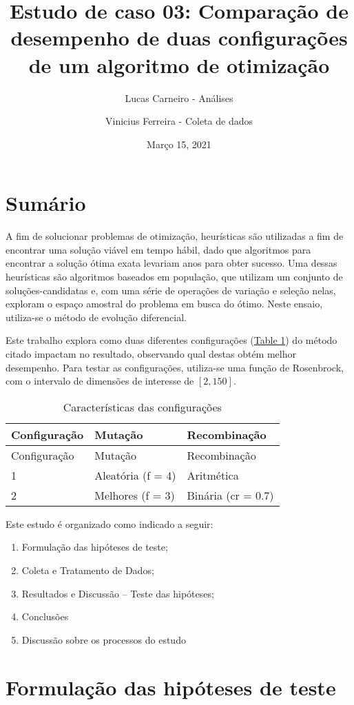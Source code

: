 \documentclass[
]{article}
\title{Estudo de caso 03: Comparação de desempenho de duas configurações
de um algoritmo de otimização}
\author{Lucas Carneiro - Análises \and Vinicius Ferreira - Coleta de
dados}
\date{Março 15, 2021}
\providecommand{\tightlist}{%
  \setlength{\itemsep}{0pt}\setlength{\parskip}{0pt}}
\begin{document}
\maketitle

\hypertarget{sumuxe1rio}{%
\section{Sumário}\label{sumuxe1rio}}

A fim de solucionar problemas de otimização, heurísticas são utilizadas
a fim de encontrar uma solução viável em tempo hábil, dado que
algoritmos para encontrar a solução ótima exata levariam anos para obter
sucesso. Uma dessas heurísticas são algoritmos baseados em população,
que utilizam um conjunto de soluções-candidatas e, com uma série de
operações de variação e seleção nelas, exploram o espaço amostral do
problema em busca do ótimo. Neste ensaio, utiliza-se o método de
evolução diferencial.

Este trabalho explora como duas diferentes configurações
(\protect\hyperlink{table1}{Table 1}) do método citado impactam no
resultado, observando qual destas obtém melhor desempenho. Para testar
as configurações, utiliza-se uma função de Rosenbrock, com o intervalo
de dimensões de interesse de \([2,150]\).

\begin{longtable}[]{@{}lll@{}}
\caption{Características das configurações}\tabularnewline
\toprule
Configuração & Mutação & Recombinação\tabularnewline
\midrule
\endfirsthead
\toprule
Configuração & Mutação & Recombinação\tabularnewline
\midrule
\endhead
1 & Aleatória (f = 4) & Aritmética\tabularnewline
2 & Melhores (f = 3) & Binária (cr = 0.7)\tabularnewline
\bottomrule
\end{longtable}

Este estudo é organizado como indicado a seguir:

\begin{enumerate}
\def\labelenumi{\arabic{enumi}.}
\tightlist
\item
  Formulação das hipóteses de teste;
\item
  Coleta e Tratamento de Dados;
\item
  Resultados e Discussão -- Teste das hipóteses;
\item
  Conclusões
\item
  Discussão sobre os processos do estudo
\end{enumerate}

\hypertarget{formulauxe7uxe3o-das-hipuxf3teses-de-teste}{%
\section{Formulação das hipóteses de
teste}\label{formulauxe7uxe3o-das-hipuxf3teses-de-teste}}
\end{document}
